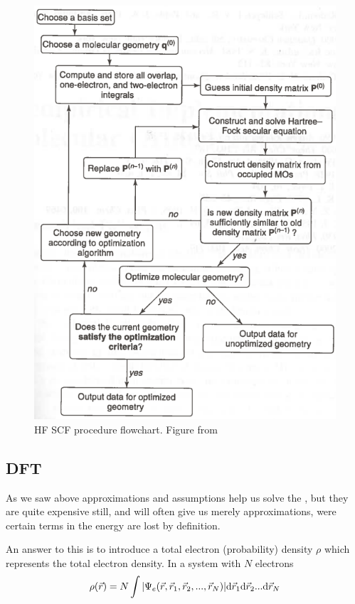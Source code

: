 \documentclass[../master_thesis.tex]{subfiles}
\begin{document}
\begin{figure}[ht]
  \includegraphics[width=\linewidth]{img/SCF.png}
  \caption{HF SCF procedure flowchart. Figure from \cite{Cramer:2004}}
  \label{fig:SCF}
\end{figure}

\subsection{\ac{DFT}}
As we saw above approximations and assumptions help us solve the \SE, but they
are quite expensive still, and will often give us merely approximations, were
certain terms in the energy are lost by definition.

An answer to this is to introduce a total electron (probability) density $\rho$ which
represents the total electron density. In a system with $N$ electrons \cite{Sorland, Cramer:2004}
\begin{equation}
  \rho(\vec{r}) = N \int\abs{\Psi_e(\vec{r}, \vec{r}_1, \vec{r}_2,..., \vec{r}_N)} \text{d}\vec{r}_1\text{d}\vec{r}_2...\text{d}\vec{r}_N
\end{equation}




\biblio
\end{document}
